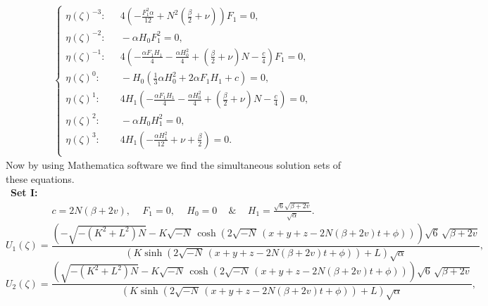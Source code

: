 \documentclass{article}
\numberwithin{equation}{section}
\begin{document}
\begin{align}
\begin{cases}
\eta{(\zeta)}^{-3} :\;\,\quad 4 \left(-\frac{F_{1}^{2} \alpha}{12}+N^{2} \left(\frac{\beta}{2}+\nu \right)\right) F_{1} = 0, \\
\eta{(\zeta)}^{-2} :\;\,\quad -\alpha  H_{0} F_{1}^{2} = 0,\\
\eta{(\zeta)}^{-1} :\,\;\quad 4 \left(-\frac{\alpha  F_{1} H_{1}}{4}-\frac{\alpha  H_{0}^{2}}{4}+\left(\frac{\beta}{2}+\nu \right) N -\frac{c}{4}\right) F_{1} = 0,\\
\eta{(\zeta)}^{0}  :\qquad -H_{0} \left(\frac{1}{3} \alpha  H_{0}^{2}+2 \alpha  F_{1} H_{1}+c \right) = 0,\\
\eta{(\zeta)}^{1}  :\qquad 4 H_{1} \left(-\frac{\alpha  F_{1} H_{1}}{4}-\frac{\alpha  H_{0}^{2}}{4}+\left(\frac{\beta}{2}+\nu \right) N -\frac{c}{4}\right) = 0,\\
\eta{(\zeta)}^{2}  :\qquad -\alpha  H_{0} H_{1}^{2} = 0, \\
\eta{(\zeta)}^{3}  :\qquad 4 H_{1} \left(-\frac{\alpha  H_{1}^{2}}{12}+\nu +\frac{\beta}{2}\right) = 0.\\
\end{cases}
\end{align}
Now by using Mathematica software we find the simultaneous solution sets of these equations.\\\
\textbf{Set I:}
\begin{eqnarray}\label{set1}
c = 2N(\beta+2v),\quad\,F_{1} = 0,\quad\, H_{0} = 0\quad\,{\&}\quad\,H_{1} = \frac{\sqrt{6}\sqrt{\beta+2v}}{\sqrt{\alpha}}.
\end{eqnarray}
\begin{equation}\label{U1}
    U_{1}\! \left(\zeta \right) =
\frac{\left(-\sqrt{-\left(K^{2}+L^{2}\right) N}-K \sqrt{-N}\, \cosh \! \left(2 \sqrt{-N}\, \left(x + y + z  -2 N \left(\beta +2 v \right) t +\phi \right)\right)\right) \sqrt{6}\, \sqrt{\beta +2 v}}{\left(K \sinh \! \left(2 \sqrt{-N}\, \left(x + y + z -2 N \left(\beta +2 v \right) t +\phi \right)\right)+L \right) \sqrt{\alpha}},
\end{equation}
\begin{equation}\label{U2}
    U_{2}\! \left(\zeta \right) =
\frac{\left(\sqrt{-\left(K^{2}+L^{2}\right) N}-K \sqrt{-N}\, \cosh \! \left(2 \sqrt{-N}\, \left(x + y + z  -2 N \left(\beta +2 v \right) t +\phi \right)\right)\right) \sqrt{6}\, \sqrt{\beta +2 v}}{\left(K \sinh \! \left(2 \sqrt{-N}\, \left(x + y + z  -2 N \left(\beta +2 v \right) t +\phi \right)\right)+L \right) \sqrt{\alpha}},
\end{equation}
\end{document}
